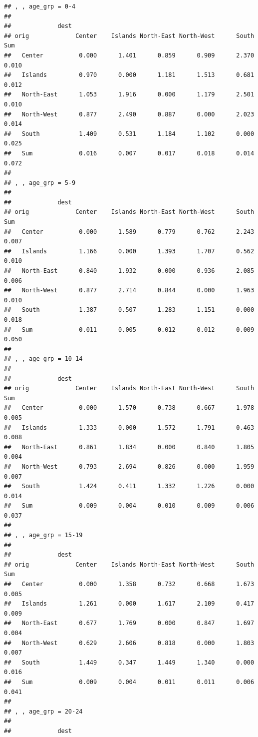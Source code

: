 \documentclass[
]{book}
\begin{document}
\begin{verbatim}
## , , age_grp = 0-4
## 
##             dest
## orig             Center    Islands North-East North-West      South        Sum
##   Center          0.000      1.401      0.859      0.909      2.370      0.010
##   Islands         0.970      0.000      1.181      1.513      0.681      0.012
##   North-East      1.053      1.916      0.000      1.179      2.501      0.010
##   North-West      0.877      2.490      0.887      0.000      2.023      0.014
##   South           1.409      0.531      1.184      1.102      0.000      0.025
##   Sum             0.016      0.007      0.017      0.018      0.014      0.072
## 
## , , age_grp = 5-9
## 
##             dest
## orig             Center    Islands North-East North-West      South        Sum
##   Center          0.000      1.589      0.779      0.762      2.243      0.007
##   Islands         1.166      0.000      1.393      1.707      0.562      0.010
##   North-East      0.840      1.932      0.000      0.936      2.085      0.006
##   North-West      0.877      2.714      0.844      0.000      1.963      0.010
##   South           1.387      0.507      1.283      1.151      0.000      0.018
##   Sum             0.011      0.005      0.012      0.012      0.009      0.050
## 
## , , age_grp = 10-14
## 
##             dest
## orig             Center    Islands North-East North-West      South        Sum
##   Center          0.000      1.570      0.738      0.667      1.978      0.005
##   Islands         1.333      0.000      1.572      1.791      0.463      0.008
##   North-East      0.861      1.834      0.000      0.840      1.805      0.004
##   North-West      0.793      2.694      0.826      0.000      1.959      0.007
##   South           1.424      0.411      1.332      1.226      0.000      0.014
##   Sum             0.009      0.004      0.010      0.009      0.006      0.037
## 
## , , age_grp = 15-19
## 
##             dest
## orig             Center    Islands North-East North-West      South        Sum
##   Center          0.000      1.358      0.732      0.668      1.673      0.005
##   Islands         1.261      0.000      1.617      2.109      0.417      0.009
##   North-East      0.677      1.769      0.000      0.847      1.697      0.004
##   North-West      0.629      2.606      0.818      0.000      1.803      0.007
##   South           1.449      0.347      1.449      1.340      0.000      0.016
##   Sum             0.009      0.004      0.011      0.011      0.006      0.041
## 
## , , age_grp = 20-24
## 
##             dest

\end{verbatim}
\end{document}
